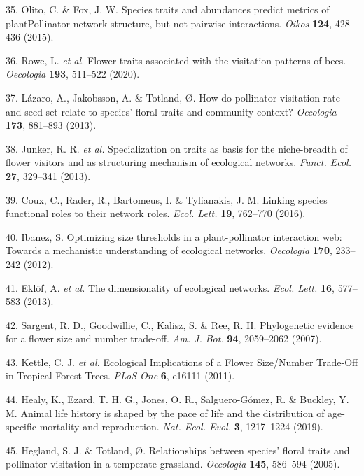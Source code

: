 \documentclass[12pt,a4paper,]{article}
\begin{document}
\hypertarget{ref-olito2015}{}
35. Olito, C. \& Fox, J. W. Species traits and abundances predict
metrics of plantPollinator network structure, but not pairwise
interactions. \emph{Oikos} \textbf{124}, 428--436 (2015).

\hypertarget{ref-rowe2020}{}
36. Rowe, L. \emph{et al.} Flower traits associated with the visitation
patterns of bees. \emph{Oecologia} \textbf{193}, 511--522 (2020).

\hypertarget{ref-lazaro2013}{}
37. Lázaro, A., Jakobsson, A. \& Totland, Ø. How do pollinator
visitation rate and seed set relate to species' floral traits and
community context? \emph{Oecologia} \textbf{173}, 881--893 (2013).

\hypertarget{ref-junker2013}{}
38. Junker, R. R. \emph{et al.} Specialization on traits as basis for
the niche-breadth of flower visitors and as structuring mechanism of
ecological networks. \emph{Funct. Ecol.} \textbf{27}, 329--341 (2013).

\hypertarget{ref-coux2016}{}
39. Coux, C., Rader, R., Bartomeus, I. \& Tylianakis, J. M. Linking
species functional roles to their network roles. \emph{Ecol. Lett.}
\textbf{19}, 762--770 (2016).

\hypertarget{ref-ibanez2012}{}
40. Ibanez, S. Optimizing size thresholds in a plant-pollinator
interaction web: Towards a mechanistic understanding of ecological
networks. \emph{Oecologia} \textbf{170}, 233--242 (2012).

\hypertarget{ref-eklof2013}{}
41. Eklöf, A. \emph{et al.} The dimensionality of ecological networks.
\emph{Ecol. Lett.} \textbf{16}, 577--583 (2013).

\hypertarget{ref-sargent2007}{}
42. Sargent, R. D., Goodwillie, C., Kalisz, S. \& Ree, R. H.
Phylogenetic evidence for a flower size and number trade-off. \emph{Am.
J. Bot.} \textbf{94}, 2059--2062 (2007).

\hypertarget{ref-kettle2011}{}
43. Kettle, C. J. \emph{et al.} Ecological Implications of a Flower
Size/Number Trade-Off in Tropical Forest Trees. \emph{PLoS One}
\textbf{6}, e16111 (2011).

\hypertarget{ref-healy2019}{}
44. Healy, K., Ezard, T. H. G., Jones, O. R., Salguero-Gómez, R. \&
Buckley, Y. M. Animal life history is shaped by the pace of life and the
distribution of age-specific mortality and reproduction. \emph{Nat.
Ecol. Evol.} \textbf{3}, 1217--1224 (2019).

\hypertarget{ref-hegland2005}{}
45. Hegland, S. J. \& Totland, Ø. Relationships between species' floral
traits and pollinator visitation in a temperate grassland.
\emph{Oecologia} \textbf{145}, 586--594 (2005).
\end{document}
